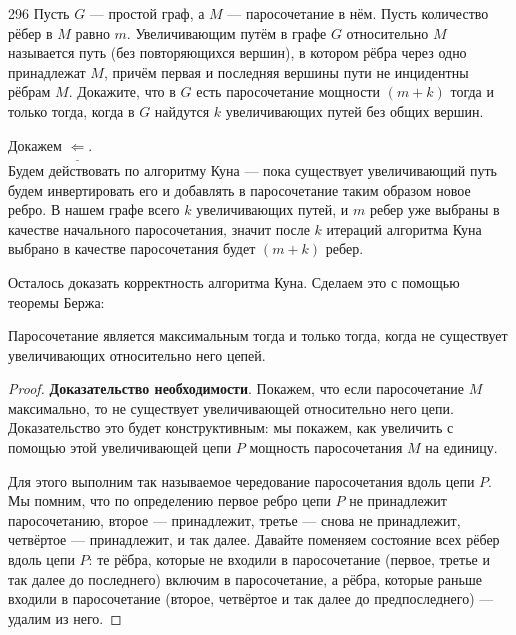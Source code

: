\begin{task}{296}
Пусть $G$ — простой граф, а $M$ — паросочетание в нём. Пусть количество рёбер в $M$ равно $m$. Увеличивающим путём в графе $G$ относительно $M$ называется путь (без повторяющихся вершин), в котором рёбра через одно принадлежат $M$, причём первая и последняя вершины пути не инцидентны рёбрам $M$. Докажите, что в $G$ есть паросочетание мощности $(m+k)$ тогда и только тогда, когда в $G$ найдутся $k$ увеличивающих путей без общих вершин.
\end{task}

\begin{solution}

Докажем $\underline{\Leftarrow}$. \\
Будем действовать по алгоритму Куна --- пока существует увеличивающий путь будем инвертировать его и добавлять в паросочетание таким образом новое ребро. В нашем графе всего $k$ увеличивающих путей, и $m$ ребер уже выбраны в качестве начального паросочетания, значит после $k$ итераций алгоритма Куна выбрано в качестве паросочетания будет $(m + k)$ ребер.

Осталось доказать корректность алгоритма Куна. Сделаем это с помощью теоремы Бержа:
\begin{theorem}
\label{Berj_theorem}
Паросочетание является максимальным тогда и только тогда, когда не существует увеличивающих относительно него цепей.
\end{theorem}

\begin{proof}\par
\textbf{Доказательство необходимости}. Покажем, что если паросочетание $M$ максимально, то не существует увеличивающей относительно него цепи. Доказательство это будет конструктивным: мы покажем, как увеличить с помощью этой увеличивающей цепи $P$ мощность паросочетания $M$ на единицу.\par

Для этого выполним так называемое чередование паросочетания вдоль цепи $P$. Мы помним, что по определению первое ребро цепи $P$ не принадлежит паросочетанию, второе — принадлежит, третье — снова не принадлежит, четвёртое — принадлежит, и так далее. Давайте поменяем состояние всех рёбер вдоль цепи $P$: те рёбра, которые не входили в паросочетание (первое, третье и так далее до последнего) включим в паросочетание, а рёбра, которые раньше входили в паросочетание (второе, четвёртое и так далее до предпоследнего) — удалим из него.\par


\end{proof}
\end{solution}
